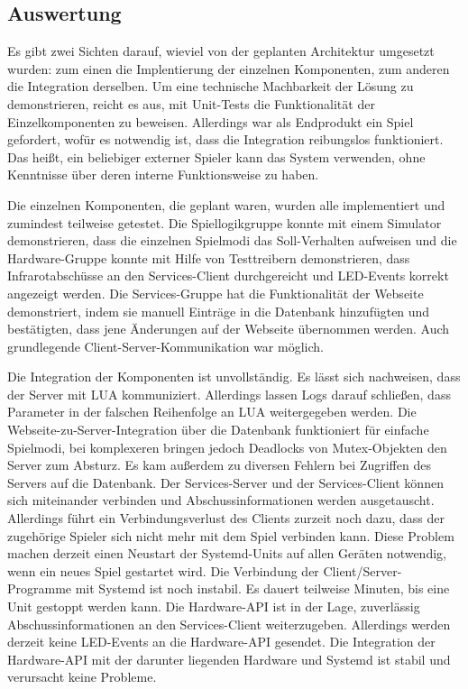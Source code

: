 \subsection{Auswertung}
\label{sec:auswertung}

Es gibt zwei Sichten darauf, wieviel von der geplanten Architektur umgesetzt wurden: zum einen die
Implentierung der einzelnen Komponenten, zum anderen die Integration derselben.
Um eine technische Machbarkeit der Lösung zu demonstrieren, reicht es aus, mit Unit-Tests die
Funktionalität der Einzelkomponenten zu beweisen.
Allerdings war als Endprodukt ein Spiel gefordert, wofür es notwendig ist, dass die Integration
reibungslos funktioniert.
Das heißt, ein beliebiger externer Spieler kann das System verwenden, ohne Kenntnisse über deren
interne Funktionsweise zu haben.

Die einzelnen Komponenten, die geplant waren, wurden alle implementiert und zumindest teilweise
getestet.
Die Spiellogikgruppe konnte mit einem Simulator demonstrieren, dass die einzelnen Spielmodi das
Soll-Verhalten aufweisen und die Hardware-Gruppe konnte mit Hilfe von Testtreibern demonstrieren,
dass Infrarotabschüsse an den Services-Client durchgereicht und LED-Events korrekt angezeigt werden.
Die Services-Gruppe hat die Funktionalität der Webseite demonstriert, indem sie manuell Einträge in
die Datenbank hinzufügten und bestätigten, dass jene Änderungen auf der Webseite übernommen werden.
Auch grundlegende Client-Server-Kommunikation war möglich.

Die Integration der Komponenten ist unvollständig.
Es lässt sich nachweisen, dass der Server mit LUA kommuniziert.
Allerdings lassen Logs darauf schließen, dass Parameter in der falschen Reihenfolge an LUA
weitergegeben werden.
Die Webseite-zu-Server-Integration über die Datenbank funktioniert für einfache Spielmodi, bei
komplexeren bringen jedoch Deadlocks von Mutex-Objekten den Server zum Absturz.
Es kam außerdem zu diversen Fehlern bei Zugriffen des Servers auf die Datenbank.
Der Services-Server und der Services-Client können sich miteinander verbinden und
Abschussinformationen werden ausgetauscht.
Allerdings führt ein Verbindungsverlust des Clients zurzeit noch dazu, dass der zugehörige Spieler
sich nicht mehr mit dem Spiel verbinden kann.
Diese Problem machen derzeit einen Neustart der Systemd-Units auf allen Geräten notwendig, wenn ein
neues Spiel gestartet wird.
Die Verbindung der Client/Server-Programme mit Systemd ist noch instabil.
Es dauert teilweise Minuten, bis eine Unit gestoppt werden kann.
Die Hardware-API ist in der Lage, zuverlässig Abschussinformationen an den Services-Client
weiterzugeben.
Allerdings werden derzeit keine LED-Events an die Hardware-API gesendet.
Die Integration der Hardware-API mit der darunter liegenden Hardware und Systemd ist stabil und
verursacht keine Probleme.

